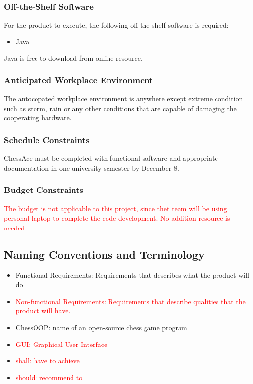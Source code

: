 \documentclass[12pt, titlepage]{article}
\begin{document}
\subsubsection{Off-the-Shelf Software}
For the product to execute, the following off-the-shelf software is required:
\begin{itemize}
\item Java
\end{itemize}
Java is free-to-download from online resource.
\subsubsection{Anticipated Workplace Environment}
The antocopated workplace environment is anywhere except extreme condition such as storm, rain or any other conditions that are capable of damaging the cooperating hardware.
\subsubsection{Schedule Constraints}
ChessAce must be completed with functional software and appropriate documentation in one university semester by December 8.
\subsubsection{Budget Constraints}
\textcolor{red}{The budget is not applicable to this project, since thet team will be using personal laptop to complete the code development. No addition resource is needed.}
\subsection{Naming Conventions and Terminology}
\begin{itemize}
\item Functional Requirements: Requirements that describes what the product will do
\item \textcolor{red}{Non-functional Requirements: Requirements that describe qualities that the product will have.}
\item ChessOOP: name of an open-source chess game program
\item \textcolor{red}{GUI: Graphical User Interface}
\item \textcolor{red}{shall: have to achieve}
\item \textcolor{red}{should: recommend to}

\end{itemize}
\end{document}
